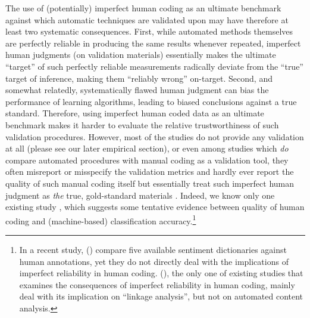 \documentclass[man, 12pt, a4paper, nolmodern, noextraspace]{apa6}
\begin{document}
    The use of (potentially) imperfect human coding as an ultimate benchmark against which automatic techniques are validated upon may have therefore at least two systematic consequences. First, while automated methods themselves are perfectly reliable in producing the same results whenever repeated, imperfect human judgments (on validation materials) essentially makes the ultimate \enquote{target} of such perfectly reliable measurements radically deviate from the \enquote{true} target of inference, making them \enquote{reliably wrong} on-target. Second, and somewhat relatedly, systematically flawed human judgment can bias the performance of learning algorithms, leading to biased conclusions against a true standard. Therefore, using imperfect human coded data as an ultimate benchmark makes it harder to evaluate the relative trustworthiness of such validation procedures. However, most of the studies do not provide any validation at all (please see our later empirical section), or even among studies which \textit{do} compare automated procedures with manual coding as a validation tool, they often misreport or misspecify the validation metrics and hardly ever report the quality of such manual coding itself but essentially treat such imperfect human judgment as \textit{the} true, gold-standard materials \parencites[e.g.,][]{gonzalez2015signals, lowe2013validating, YoungSoroka2012}. Indeed, we know only one existing study \parencite{burscher2014teaching}, which suggests some tentative evidence between quality of human coding and (machine-based) classification accuracy.\footnote{In a recent study, \citeauthor{gonzalez2015signals} (\citeyear{gonzalez2015signals}) compare five available sentiment dictionaries against human annotations, yet they do not directly deal with the implications of imperfect reliability in human coding. \citeauthor{scharkow2017measurement} (\citeyear{scharkow2017measurement}), the only one of existing studies that examines the consequences of imperfect reliability in human coding, mainly deal with its implication on \enquote{linkage analysis}, but not on automated content analysis.}     
   
\end{document}

